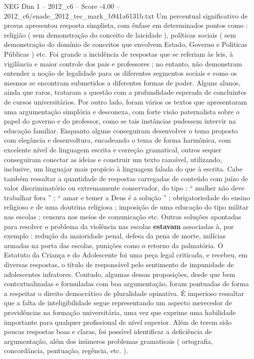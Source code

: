 \begin{textsample}{NEG Dim 1 – 2012\_c6 – Score -4.00 – 2012\_c6/enade\_2012\_tec\_mark\_b941a6131b.txt}
Um percentual significativo de provas apresentou resposta simplista, com ênfase em determinados pontos como : religião ( sem demonstração do conceito de laicidade ), políticas sociais ( sem demonstração do domínio de conceitos que envolvem Estado, Governo e Politicas Públicas ) etc.
Foi grande a incidência de respostas que se referiam às leis, à vigilância e maior controle dos pais e professores ; no entanto, não demonstram entender a noção de legalidade para os diferentes segmentos sociais e como os mesmos se encontram submetidos a diferentes formas de poder.
Alguns alunos, ainda que raros, trataram a questão com a profundidade esperada de concluintes de cursos universitários.
Por outro lado, foram vários os textos que apresentaram uma argumentação simplória e desconexa, com forte visão paternalista sobre o papel do governo e do professor, como se tais instâncias pudessem intervir na educação familiar.
Enquanto alguns conseguiram desenvolver o tema proposto com elegância e desenvoltura, encadeando o tema de forma harmônica, com excelente nível de linguagem escrita e correção gramatical, outros sequer conseguiram conectar as ideias e construir um texto razoável, utilizando, inclusive, um linguajar mais propício à linguagem falada do que à escrita.
Cabe também ressaltar a quantidade de respostas carregadas de conteúdo com juízo de valor discriminatório ou extremamente conservador, do tipo : “ mulher não deve trabalhar fora ” ; “ amar e temer a Deus é a solução ” ; obrigatoriedade do ensino religioso e de uma doutrina religiosa ; imposição de uma educação do tipo militar nas escolas ; censura nos meios de comunicação etc.
Outras soluções apontadas para resolver o problema da violência nas escolas \textbf{estavam} associadas à, por exemplo : redução da maioridade penal, defesa da pena de morte, milícias armadas na porta das escolas, punições como o retorno da palmatória.
O Estatuto da Criança e do Adolescente foi uma peça legal criticada, e recebeu, em diversas respostas, o título de responsável pelo sentimento de impunidade de adolescentes infratores.
Contudo, algumas dessas proposições, desde que bem contextualizadas e formuladas com boa argumentação, foram pontuadas de forma a respeitar o direito democrático de pluralidade opinativa.
É imperioso ressaltar que a falta de inteligibilidade segue representando um aspecto merecedor de providências na formação universitária, uma vez que exprime uma habilidade importante para qualquer profissional de nível superior.
Além de terem sido poucas respostas boas e claras, foi possível identificar a deficiência de argumentação, além dos inúmeros problemas gramaticais ( ortografia, concordância, pontuação, regência, etc. ).

\end{textsample}
